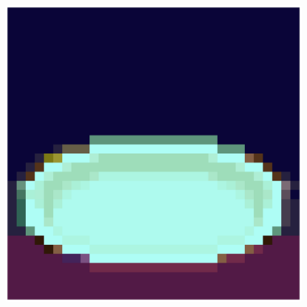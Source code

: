 \begin{figure}[h!]
\begin{minipage}[b]{0.25\textwidth}
    \end{minipage}
    \hfill 
    \begin{minipage}[b]{0.25\textwidth}
        \includegraphics[width=\textwidth]{imagens/01_dish.result.png}
    \end{minipage}
\end{figure}

